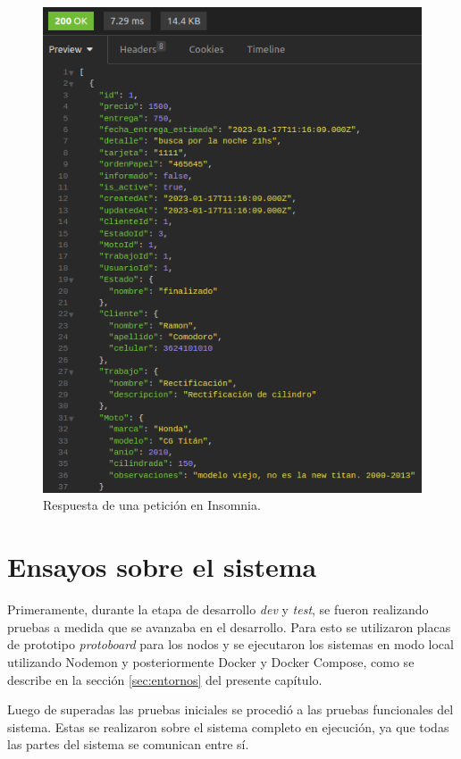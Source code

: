\begin{figure}[H]
	\centering
	\includegraphics[scale=.65]{./Figures/insomnia-request-2.png}
	\caption{Respuesta de una petición en Insomnia.}
	\label{fig:insomnia-request-2}
\end{figure}


\section{Ensayos sobre el sistema}
\label{sec:ensayos-nodos}

Primeramente, durante la etapa de desarrollo \textit{dev} y \textit{test}, se fueron realizando pruebas a medida que se avanzaba en el desarrollo. Para esto se utilizaron placas de prototipo \textit{protoboard} para los nodos y se ejecutaron los sistemas en modo local utilizando Nodemon \cite{nodemon} y posteriormente Docker y Docker Compose, como se describe en la sección \ref{sec:entornos} del presente capítulo.

Luego de superadas las pruebas iniciales se procedió a las pruebas funcionales del sistema. Estas se realizaron sobre el sistema completo en ejecución, ya que todas las partes del sistema se comunican entre sí. 

